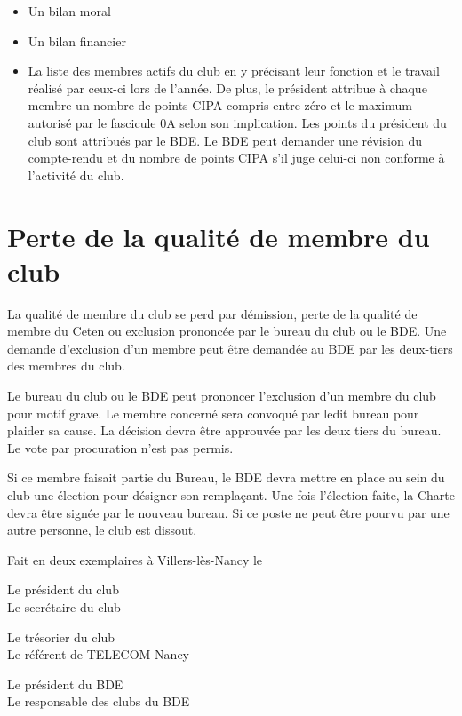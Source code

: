 \documentclass{article}
\begin{document}
\begin{multicols}{2}
{			\begin{itemize}
				\item Un bilan moral
				\item Un bilan financier
				\item La liste des membres actifs du club en y précisant
					leur fonction et le travail réalisé par ceux-ci lors de
					l’année. De plus, le président attribue à chaque
					membre un nombre de points CIPA compris entre
					zéro et le maximum autorisé par le fascicule 0A
					selon son implication. Les points du président du
					club sont attribués par le BDE\@.
					Le BDE peut demander une révision du compte-rendu et du
					nombre de points CIPA s’il juge celui-ci non conforme à
					l’activité du club.
			\end{itemize}

		}
		
		\section{Perte de la qualité de membre du club}

		{\small

			La qualité de membre du club se perd par démission, perte
			de la qualité de membre du Ceten ou exclusion prononcée
			par le bureau du club ou le BDE\@. Une demande d’exclusion
			d’un membre peut être demandée au BDE par les deux-tiers
			des membres du club.

			Le bureau du club ou le BDE peut prononcer l’exclusion d’un
			membre du club pour motif grave. Le membre concerné
			sera convoqué par ledit bureau pour plaider sa cause. La
			décision devra être approuvée par les deux tiers du bureau.
			Le vote par procuration n’est pas permis.

			Si ce membre faisait partie du Bureau, le BDE devra mettre
			en place au sein du club une élection pour désigner son
			remplaçant. Une fois l’élection faite, la Charte devra être
			signée par le nouveau bureau. Si ce poste ne peut être
			pourvu par une autre personne, le club est dissout.

		}
		
	\end{multicols}

	\vfill
	Fait en deux exemplaires à Villers-lès-Nancy le \underline{\hspace{5cm}}
	\vfill

	\begin{multicols}{2}
		Le président du club \\
		Le secrétaire du club 
	\end{multicols}
		\vspace*{4cm}
	\begin{multicols}{2}
		Le trésorier du club \\
		Le référent de TELECOM Nancy 
	\end{multicols}
		\vspace*{4cm}
	\begin{multicols}{2}
		Le président du BDE \\
		Le responsable des clubs du BDE 
	\end{multicols}
		\vspace*{4cm}
\end{document}
